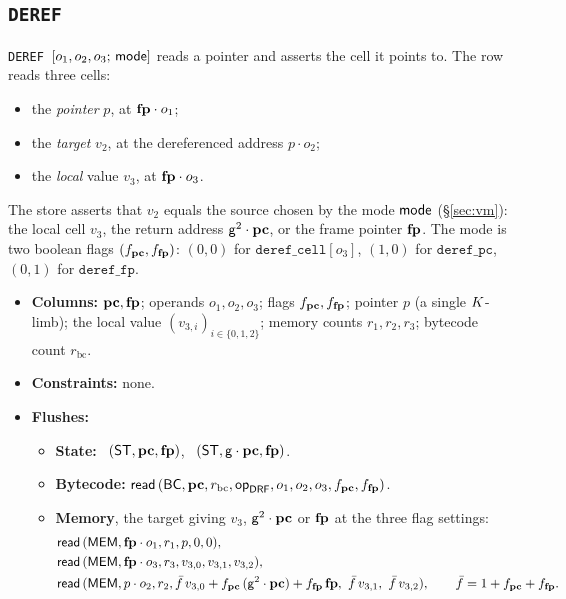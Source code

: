 \subsection{\texttt{DEREF}}\label{sec:tab-deref}

\texttt{DEREF}\ $[o_1,o_2,o_3;\,\mathsf{mode}]$ reads a pointer and asserts the cell it points to. The row reads three cells:
\begin{itemize}
\item the \emph{pointer} $p$, at $\mathbf{fp}\cdot o_1$;
\item the \emph{target} $v_2$, at the dereferenced address $p\cdot o_2$;
\item the \emph{local} value $v_3$, at $\mathbf{fp}\cdot o_3$.
\end{itemize}
The store asserts that $v_2$ equals the source chosen by the mode $\mathsf{mode}$ (\S\ref{sec:vm}): the local cell $v_3$, the return address $\mathsf{g}^{2}\cdot\mathbf{pc}$, or the frame pointer $\mathbf{fp}$. The mode is two boolean flags $(f_{\mathbf{pc}},f_{\mathbf{fp}})$: $(0,0)$ for $\texttt{deref\_cell}[o_3]$, $(1,0)$ for $\texttt{deref\_pc}$, $(0,1)$ for $\texttt{deref\_fp}$.
\begin{itemize}
\item \textbf{Columns:} $\mathbf{pc},\mathbf{fp}$; operands $o_1,o_2,o_3$; flags $f_{\mathbf{pc}},f_{\mathbf{fp}}$; pointer $p$ (a single $K$-limb); the local value $(v_{3,i})_{i\in\{0,1,2\}}$; memory counts $r_1,r_2,r_3$; bytecode count $r_{\mathrm{bc}}$.
\item \textbf{Constraints:} none.
\item \textbf{Flushes:}
  \begin{itemize}
  \item \textbf{State:} \pull\ $( \mathsf{ST},\mathbf{pc},\mathbf{fp} )$, \push\ $( \mathsf{ST},\mathsf{g}\cdot\mathbf{pc},\mathbf{fp} )$.
  \item \textbf{Bytecode:} $\mathsf{read}\,( \mathsf{BC},\mathbf{pc},r_{\mathrm{bc}},\mathsf{op}_{\mathsf{DRF}},o_1,o_2,o_3,f_{\mathbf{pc}},f_{\mathbf{fp}} )$.
  \item \textbf{Memory}, the target giving $v_3$, $\mathsf{g}^{2}\cdot\mathbf{pc}$ or $\mathbf{fp}$ at the three flag settings:
    \begin{align*}
      &\rdf{\dsep{MEM},\fp\cdot o_1,r_1,p,0,0},\\
      &\rdf{\dsep{MEM},\fp\cdot o_3,r_3,v_{3,0},v_{3,1},v_{3,2}},\\
      &\rdf{\dsep{MEM},p\cdot o_2,r_2,\bar f\,v_{3,0}+f_{\pc}\,(\gen^{2}\cdot\pc)+f_{\fp}\,\fp,\ \bar f\,v_{3,1},\ \bar f\,v_{3,2}},
      \qquad \bar f=1+f_{\pc}+f_{\fp}.
    \end{align*}
  \end{itemize}
\end{itemize}

